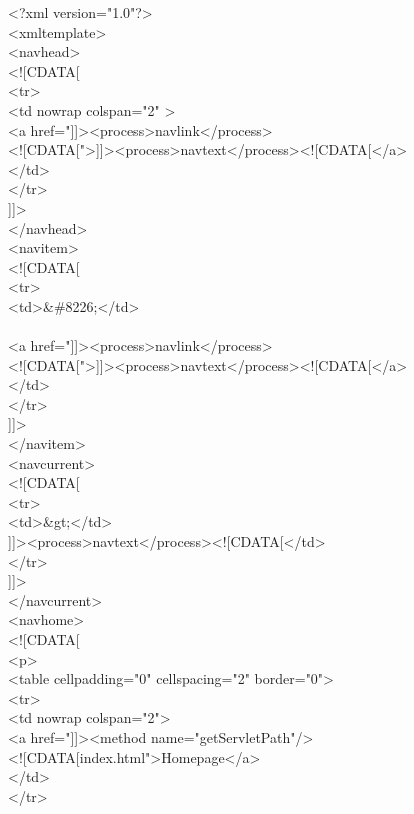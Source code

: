 \begin{xml}
<?xml version="1.0"?>\\
<xmltemplate>\\

<navhead>\\
<![CDATA[\\
<tr>\\
\xtaba <td nowrap colspan="2" >\\
\xtaba <a href="]]><process>navlink</process>\\
\xtaba <![CDATA[">]]><process>navtext</process><![CDATA[</a>\\
\xtaba </td>\\
</tr>\\
]]>\\
</navhead>\\
<navitem>\\
<![CDATA[\\
<tr>\\
\xtaba <td>\&\#8226;</td>\\
\\
\xtaba <a href="]]><process>navlink</process>\\
\xtaba <![CDATA[">]]><process>navtext</process><![CDATA[</a>\\
\xtaba </td>\\
</tr>\\
]]>\\
</navitem>\\
<navcurrent>\\
<![CDATA[\\
<tr>\\
\xtaba <td>\&gt;</td>\\
]]><process>navtext</process><![CDATA[</td>\\
</tr>\\
]]>\\
</navcurrent>\\
<navhome>\\
<![CDATA[\\
<p>\\
<table cellpadding="0" cellspacing="2" border="0">\\
<tr>\\
\xtaba <td nowrap colspan="2">\\
\xtaba <a href="]]><method name="getServletPath"/>\\
\xtaba <![CDATA[index.html">Homepage</a>\\
\xtaba </td>\\
</tr>\\

\end{xml}
